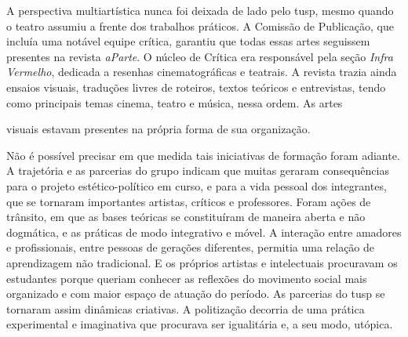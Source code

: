 A perspectiva multiartística nunca foi deixada de lado pelo {\sc tusp}, mesmo
quando o teatro assumiu a frente dos trabalhos práticos. A Comissão de
Publicação, que incluía uma notável equipe crítica, garantiu que todas
essas artes seguissem presentes na revista {\it aParte}. O núcleo de
Crítica era responsável pela seção {\it Infra Vermelho}, dedicada a
resenhas cinematográficas e teatrais. A revista trazia ainda ensaios
visuais, traduções livres de roteiros, textos teóricos e entrevistas,
tendo como principais temas cinema, teatro e música, nessa ordem. As
artes

\column

\noindent{}visuais estavam presentes na própria forma de sua organização.

Não é possível precisar em que medida tais iniciativas de formação
foram adiante. A trajetória e as parcerias do grupo indicam que muitas
geraram consequências para o projeto estético-político em curso, e para
a vida pessoal dos integrantes, que se tornaram importantes artistas,
críticos e professores. Foram ações de trânsito, em que as bases
teóricas se constituíram de maneira aberta e não dogmática, e as
práticas de modo integrativo e móvel. A interação entre amadores e
profissionais, entre pessoas de gerações diferentes, permitia uma
relação de aprendizagem não tradicional. E os próprios artistas e
intelectuais procuravam os estudantes porque queriam conhecer as
reflexões do movimento social mais organizado e com maior espaço de
atuação do período. As parcerias do {\sc tusp} se tornaram assim dinâmicas
criativas. A politização decorria de uma prática experimental e
imaginativa que procurava ser igualitária e, a seu modo, utópica.

\page

{}{}
{}{}
{}{}
\stopcombination

\page

\subject{Base de ensaios e parcerias institucionais}


